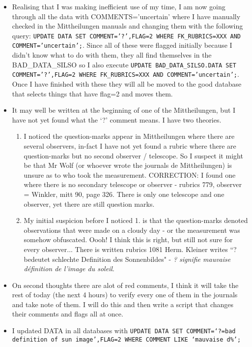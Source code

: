 \documentclass[12pt]{article}
\begin{document}
\begin{itemize}
    \item Realising that I was making inefficient use of my time, I am now going through all the data with COMMENTS='uncertain' where I have manually checked in the Mittheilungen manuals and changing them with the following query: \texttt{UPDATE DATA SET COMMENT='?',FLAG=2 WHERE FK\_RUBRICS=XXX AND COMMENT='uncertain';}. Since all of these were flagged initially because I didn't know what to do with them, they all find themselves in the BAD\_DATA\_SILSO so I also execute \texttt{UPDATE BAD\_DATA\_SILSO.DATA SET COMMENT='?',FLAG=2 WHERE FK\_RUBRICS=XXX AND COMMENT='uncertain';}. Once I have finished with these they will all be moved to the good database that selects things that have flag=2 and moves them.
    \item It may well be written at the beginning of one of the Mittheilungen, but I have not yet found what the `?' comment means. I have two theories.\label{what is flag 2 question mark}
    \begin{enumerate}
        \item I noticed the question-marks appear in Mittheilungen where there are several observers, in-fact I have not yet found a rubric where there are question-marks but no second observer / telescope. So I suspect it might be that Mr Wolf (or whoever wrote the journals de Mittheilungen) is unsure as to who took the measurement. CORRECTION: I found one where there is no secondary telescope or observer - rubrics 779, observer = Winkler, mitt 90, page 326. There is only one telescope and one observer, yet there are still question marks.
        \item My initial suspicion before I noticed 1. is that the question-marks denoted observations that were made on a cloudy day - or the measurement was somehow obfuscated. Oooh! I think this is right, but still not sure for every observer... There is written rubrics 1081 Herm. Kleiner writes ``? bedeutet schlechte Definition des Sonnenbildes" - \textit{? signifie mauvaise définition de l'image du soleil}.
    \end{enumerate}
    \item On second thoughts there are alot of red comments, I think it will take the rest of today (the next 4 hours) to verify every one of them in the journals and take note of them. I will do this and then write a script that changes their comments and flags all at once.
    \item I updated DATA in all databases with \texttt{UPDATE DATA SET COMMENT=`?=bad definition of sun image',FLAG=2 WHERE COMMENT LIKE `mauvaise d\%';}

\end{itemize}
\end{document}

